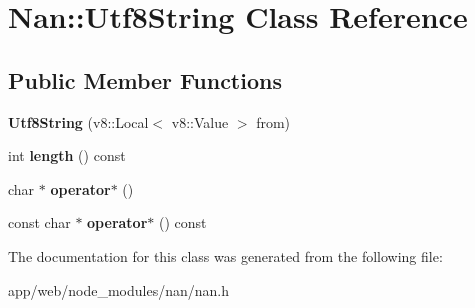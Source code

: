 \hypertarget{class_nan_1_1_utf8_string}{}\section{Nan\+:\+:Utf8\+String Class Reference}
\label{class_nan_1_1_utf8_string}
\subsection*{Public Member Functions}
\begin{DoxyCompactItemize}
\item 
\mbox{\label{class_nan_1_1_utf8_string_ab7e34e3cc5045d2d3e693a1968adf954}} 
{\bfseries Utf8\+String} (v8\+::\+Local$<$ v8\+::\+Value $>$ from)
\item 
\mbox{\label{class_nan_1_1_utf8_string_a627c2e6e7de1a4bb5e8321cdbbde957f}} 
int {\bfseries length} () const
\item 
\mbox{\label{class_nan_1_1_utf8_string_aa4993460b9bda23c1a393c485564ae23}} 
char $\ast$ {\bfseries operator$\ast$} ()
\item 
\mbox{\label{class_nan_1_1_utf8_string_a86585c33a7c3c03a767aee4b7a824278}} 
const char $\ast$ {\bfseries operator$\ast$} () const
\end{DoxyCompactItemize}


The documentation for this class was generated from the following file\+:\begin{DoxyCompactItemize}
\item 
app/web/node\+\_\+modules/nan/nan.\+h\end{DoxyCompactItemize}
